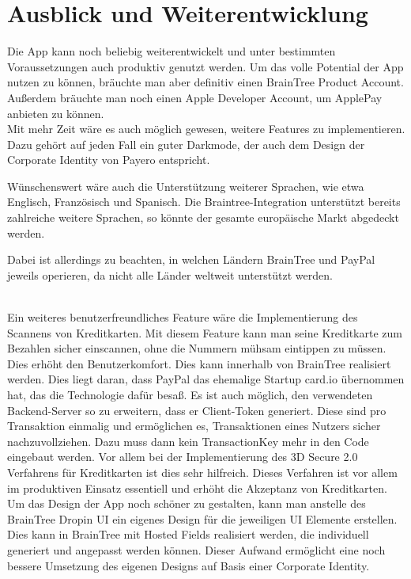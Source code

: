 
\chapter{Ausblick und Weiterentwicklung}

Die App kann noch beliebig weiterentwickelt und unter bestimmten Voraussetzungen auch produktiv genutzt werden.
Um das volle Potential der App nutzen zu können, bräuchte man aber definitiv einen BrainTree Product Account.
Außerdem bräuchte man noch einen Apple Developer Account, um ApplePay anbieten zu können.\\
Mit mehr Zeit wäre es auch möglich gewesen, weitere Features zu implementieren.
Dazu gehört auf jeden Fall ein guter Darkmode, der auch dem Design der Corporate Identity von \glqq Payero\grqq{} entspricht.

Wünschenswert wäre auch die Unterstützung weiterer Sprachen, wie etwa Englisch, Französisch und Spanisch.
Die Braintree-Integration unterstützt bereits zahlreiche weitere Sprachen, so könnte der gesamte europäische Markt abgedeckt werden.

Dabei ist allerdings zu beachten, in welchen Ländern BrainTree und PayPal jeweils operieren, da nicht alle Länder weltweit unterstützt werden.

\\
Ein weiteres benutzerfreundliches Feature wäre die Implementierung des Scannens von Kreditkarten.
Mit diesem Feature kann man seine Kreditkarte zum Bezahlen sicher einscannen, ohne die Nummern mühsam eintippen zu müssen.
Dies erhöht den Benutzerkomfort.
Dies kann innerhalb von BrainTree realisiert werden.
Dies liegt daran, dass PayPal das ehemalige Startup card.io übernommen hat, das die Technologie dafür besaß.
Es ist auch möglich, den verwendeten Backend-Server so zu erweitern, dass er Client-Token generiert.
Diese sind pro Transaktion einmalig und ermöglichen es, Transaktionen eines Nutzers sicher nachzuvollziehen.
Dazu muss dann kein TransactionKey mehr in den Code eingebaut werden.
Vor allem bei der Implementierung des 3D Secure 2.0 Verfahrens für Kreditkarten ist dies sehr hilfreich.
Dieses Verfahren ist vor allem im produktiven Einsatz essentiell und erhöht die Akzeptanz von Kreditkarten.
Um das Design der App noch schöner zu gestalten, kann man anstelle des BrainTree Dropin UI ein eigenes Design für die jeweiligen UI Elemente erstellen.
Dies kann in BrainTree mit Hosted Fields realisiert werden, die individuell generiert und angepasst werden können.
Dieser Aufwand ermöglicht eine noch bessere Umsetzung des eigenen Designs auf Basis einer Corporate Identity.
